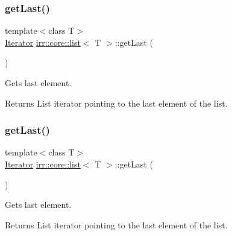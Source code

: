 \subsubsection{\texorpdfstring{get\+Last()}{getLast()}\hspace{0.1cm}{\footnotesize\ttfamily [1/4]}}
{\footnotesize\ttfamily template$<$class T$>$ \\
\hyperlink{classirr_1_1core_1_1list_1_1Iterator}{Iterator} \hyperlink{classirr_1_1core_1_1list}{irr\+::core\+::list}$<$ T $>$\+::get\+Last (\begin{DoxyParamCaption}{ }\end{DoxyParamCaption})\hspace{0.3cm}{\ttfamily [inline]}}



Gets last element. 

\begin{DoxyReturn}{Returns}
List iterator pointing to the last element of the list. 
\end{DoxyReturn}
\mbox{\label{classirr_1_1core_1_1list_a6ba09d4c7865a451e40b5bd5f4c2dd50}} 
\subsubsection{\texorpdfstring{get\+Last()}{getLast()}\hspace{0.1cm}{\footnotesize\ttfamily [2/4]}}
{\footnotesize\ttfamily template$<$class T$>$ \\
\hyperlink{classirr_1_1core_1_1list_1_1Iterator}{Iterator} \hyperlink{classirr_1_1core_1_1list}{irr\+::core\+::list}$<$ T $>$\+::get\+Last (\begin{DoxyParamCaption}{ }\end{DoxyParamCaption})\hspace{0.3cm}{\ttfamily [inline]}}



Gets last element. 

\begin{DoxyReturn}{Returns}
List iterator pointing to the last element of the list. 
\end{DoxyReturn}
\mbox{\label{classirr_1_1core_1_1list_a7b296ee9e099847dadf9a0a18df842e9}} 

